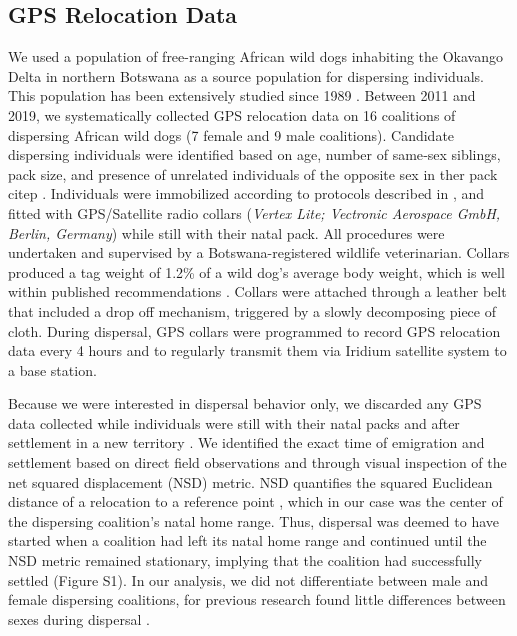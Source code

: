 \documentclass[abstract=on,10pt,a4paper,bibliography=totocnumbered]{article}
\begin{document}
\subsection{GPS Relocation Data}
We used a population of free-ranging African wild dogs inhabiting the Okavango
Delta in northern Botswana as a source population for dispersing individuals.
This population has been extensively studied since 1989 \citep{McNutt.1996,
Cozzi.2013, Cozzi.2020, Behr.2020}. Between 2011 and 2019, we systematically
collected GPS relocation data on 16 coalitions of dispersing African wild dogs
(7 female and 9 male coalitions). Candidate dispersing individuals were
identified based on age, number of same‐sex siblings, pack size, and presence of
unrelated individuals of the opposite sex in ther pack citep \citep{McNutt.1996,
Behr.2020}. Individuals were immobilized
according to protocols described in \cite{Osofsky.1996}, and fitted with
GPS/Satellite radio collars (\textit{Vertex Lite; Vectronic Aerospace GmbH,
Berlin, Germany}) while still with their natal pack. All procedures were
undertaken and supervised by a Botswana-registered wildlife veterinarian.
Collars produced a tag weight of 1.2\% of a wild dog's average body weight,
which is well within published recommendations \citep{Kenward.2000}. Collars
were attached through a leather belt that included a drop off mechanism,
triggered by a slowly decomposing piece of cloth. During dispersal, GPS collars were programmed to
record GPS relocation data every 4 hours and to regularly transmit them via
Iridium satellite system to a base station.

Because we were interested in dispersal behavior only, we discarded any GPS data
collected while individuals were still with their natal packs and after
settlement in a new territory \citep{Cozzi.2020}. We identified the exact time
of emigration and settlement based on direct field observations and through
visual inspection of the net squared displacement (NSD) metric. NSD quantifies
the squared  Euclidean distance of a relocation to a
reference point \citep{Borger.2012}, which in our case was the center of the
dispersing coalition's natal home range. Thus, dispersal was deemed to have
started when a coalition had left its natal home range and continued until the
NSD metric remained stationary, implying that the coalition had successfully
settled (Figure S1). In our analysis, we did not differentiate between male and
female dispersing coalitions, for previous research found little differences
between sexes during dispersal \citep{Woodroffe.2019, Cozzi.2020}.
\end{document}
